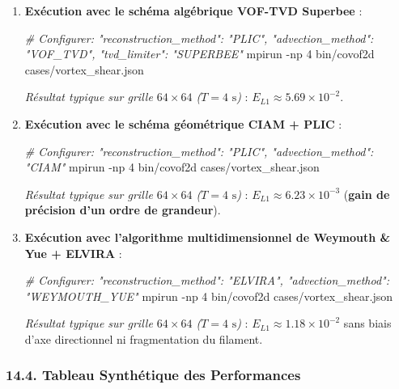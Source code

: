 \documentclass[
  french,
]{article}
\newenvironment{Shaded}{}{}
\newcommand{\AttributeTok}[1]{\textcolor[rgb]{0.49,0.56,0.16}{#1}}
\newcommand{\CommentTok}[1]{\textcolor[rgb]{0.38,0.63,0.69}{\textit{#1}}}
\newcommand{\ExtensionTok}[1]{#1}
\newcommand{\NormalTok}[1]{#1}
\begin{document}
\begin{enumerate}
\def\labelenumi{\arabic{enumi}.}
\item
  \textbf{Exécution avec le schéma algébrique VOF-TVD Superbee} :

\begin{Shaded}
\begin{Highlighting}[]
\CommentTok{\# Configurer: "reconstruction\_method": "PLIC", "advection\_method": "VOF\_TVD", "tvd\_limiter": "SUPERBEE"}
\ExtensionTok{mpirun} \AttributeTok{{-}np}\NormalTok{ 4 bin/covof2d cases/vortex\_shear.json}
\end{Highlighting}
\end{Shaded}

  \emph{Résultat typique sur grille \(64 \times 64\) (\(T=4\text{ s}\))}
  : \(E_{L1} \approx 5.69 \times 10^{-2}\).
\item
  \textbf{Exécution avec le schéma géométrique CIAM + PLIC} :

\begin{Shaded}
\begin{Highlighting}[]
\CommentTok{\# Configurer: "reconstruction\_method": "PLIC", "advection\_method": "CIAM"}
\ExtensionTok{mpirun} \AttributeTok{{-}np}\NormalTok{ 4 bin/covof2d cases/vortex\_shear.json}
\end{Highlighting}
\end{Shaded}

  \emph{Résultat typique sur grille \(64 \times 64\) (\(T=4\text{ s}\))}
  : \(E_{L1} \approx 6.23 \times 10^{-3}\) (\textbf{gain de précision
  d'un ordre de grandeur}).
\item
  \textbf{Exécution avec l'algorithme multidimensionnel de Weymouth \&
  Yue + ELVIRA} :

\begin{Shaded}
\begin{Highlighting}[]
\CommentTok{\# Configurer: "reconstruction\_method": "ELVIRA", "advection\_method": "WEYMOUTH\_YUE"}
\ExtensionTok{mpirun} \AttributeTok{{-}np}\NormalTok{ 4 bin/covof2d cases/vortex\_shear.json}
\end{Highlighting}
\end{Shaded}

  \emph{Résultat typique sur grille \(64 \times 64\) (\(T=4\text{ s}\))}
  : \(E_{L1} \approx 1.18 \times 10^{-2}\) sans biais d'axe directionnel
  ni fragmentation du filament.
\end{enumerate}

\subsubsection{14.4. Tableau Synthétique des
Performances}\label{tableau-synthuxe9tique-des-performances}
\end{document}
